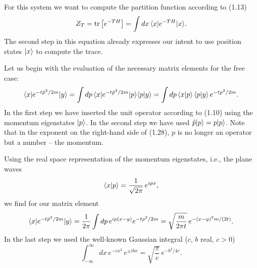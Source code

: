 For this system we want to compute the partition function according to (1.13)
\begin{equation}
  Z_T = \operatorname{tr}\big[e^{-TH}\big] = \int dx\,\langle x|e^{-TH}|x\rangle.
\end{equation}
The second step in this equation already expresses our intent to use position
states $|x\rangle$ to compute the trace.

Let us begin with the evaluation of the necessary matrix elements for the free
case:
\begin{equation}
  \langle x|e^{-t\hat{p}^2/2m}|y\rangle
  = \int dp\,\langle x|e^{-t\hat{p}^2/2m}|p\rangle\langle p|y\rangle
  = \int dp\,\langle x|p\rangle\,\langle p|y\rangle\,e^{-tp^2/2m}.
\end{equation}
In the first step we have inserted the unit operator according to (1.10) using
the momentum eigenstates $|p\rangle$. In the second step we have used
$\hat{p}|p\rangle = p|p\rangle$. Note that in the exponent on the right-hand side
of (1.28), $p$ is no longer an operator but a number -- the momentum.

Using the real space representation of the momentum eigenstates, i.e., the
plane waves
\begin{equation}
  \langle x|p\rangle = \frac{1}{\sqrt{2\pi}}\,e^{ipx},
\end{equation}
we find for our matrix element
\begin{equation}
  \langle x|e^{-t\hat{p}^2/2m}|y\rangle
  = \frac{1}{2\pi}\int dp\,e^{ip(x-y)}e^{-tp^2/2m}
  = \sqrt{\frac{m}{2\pi t}}\,e^{-(x-y)^2m/(2t)}.
\end{equation}
In the last step we used the well-known Gaussian integral ($c$, $b$ real,
$c > 0$)
\begin{equation}
  \int_{-\infty}^{\infty}dx\,e^{-cx^2}\,e^{\pm ibx}
  = \sqrt{\frac{\pi}{c}}\,e^{-b^2/4c}.
\end{equation}

